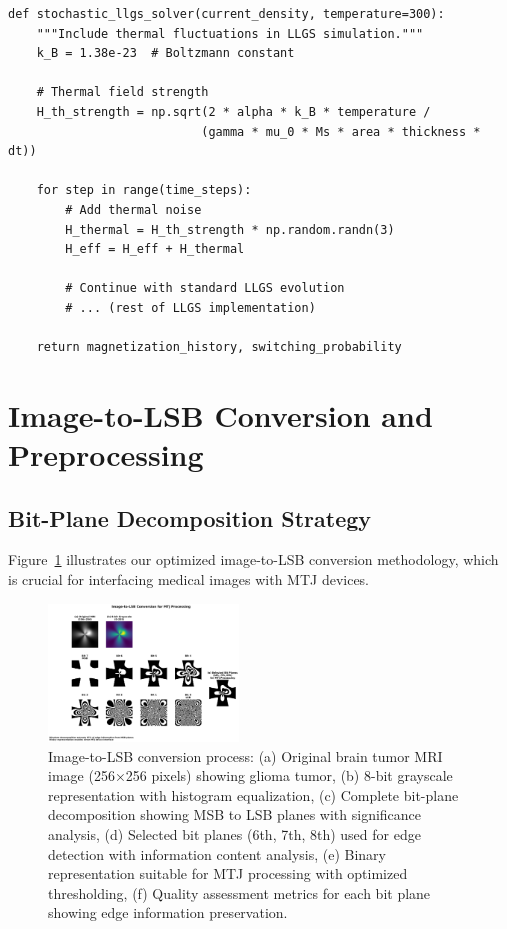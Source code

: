 \documentclass[conference]{IEEEtran}
\begin{document}
\begin{lstlisting}[caption={Stochastic LLGS implementation with thermal effects}]
def stochastic_llgs_solver(current_density, temperature=300):
    """Include thermal fluctuations in LLGS simulation."""
    k_B = 1.38e-23  # Boltzmann constant
    
    # Thermal field strength
    H_th_strength = np.sqrt(2 * alpha * k_B * temperature / 
                           (gamma * mu_0 * Ms * area * thickness * dt))
    
    for step in range(time_steps):
        # Add thermal noise
        H_thermal = H_th_strength * np.random.randn(3)
        H_eff = H_eff + H_thermal
        
        # Continue with standard LLGS evolution
        # ... (rest of LLGS implementation)
        
    return magnetization_history, switching_probability
\end{lstlisting}

\section{Image-to-LSB Conversion and Preprocessing}

\subsection{Bit-Plane Decomposition Strategy}

Figure~\ref{fig:image_to_lsb} illustrates our optimized image-to-LSB conversion methodology, which is crucial for interfacing medical images with MTJ devices.

\begin{figure}[htbp]
\centerline{\includegraphics[width=0.45\textwidth]{image_to_lsb_conversion.png}}
\caption{Image-to-LSB conversion process: (a) Original brain tumor MRI image (256×256 pixels) showing glioma tumor, (b) 8-bit grayscale representation with histogram equalization, (c) Complete bit-plane decomposition showing MSB to LSB planes with significance analysis, (d) Selected bit planes (6th, 7th, 8th) used for edge detection with information content analysis, (e) Binary representation suitable for MTJ processing with optimized thresholding, (f) Quality assessment metrics for each bit plane showing edge information preservation.}
\label{fig:image_to_lsb}
\end{figure}
\end{document}
